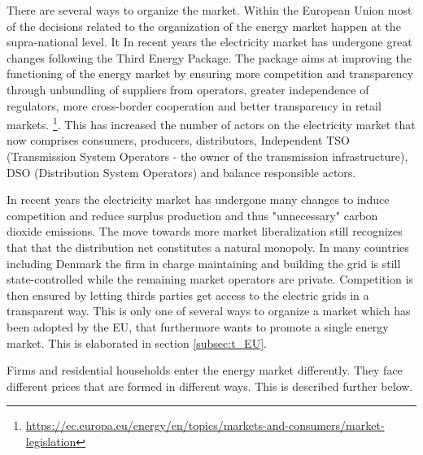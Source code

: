 There are several ways to organize the market. Within the European Union most of the decisions related to the organization of the energy market happen at the supra-national level. It In recent years the electricity market has undergone great changes following the Third Energy Package. The package aims at improving the functioning of the energy market by ensuring more competition and transparency through unbundling of suppliers from operators, greater independence of regulators, more cross-border cooperation and better transparency in retail markets. \footnote{\url{https://ec.europa.eu/energy/en/topics/markets-and-consumers/market-legislation}}. This has increased the number of actors on the electricity market that now comprises consumers, producers, distributors, Independent TSO (Transmission System Operators - the owner of the transmission infrastructure), DSO (Distribution System Operators) and balance responsible actors.
\par
In recent years the electricity market has undergone many changes to induce competition and reduce surplus production and thus "unnecessary" carbon dioxide emissions. The move towards more market liberalization still recognizes that that the distribution net constitutes a natural monopoly. In many countries including Denmark the firm in charge maintaining and building the grid is still state-controlled while the remaining market operators are private. Competition is then ensured by letting thirds parties get access to the electric grids in a transparent way. This is only one of several ways to organize a market which has been adopted by the EU, that furthermore wants to promote a single energy market. This is elaborated in section \ref{subsec:t_EU}.
\par

Firms and residential households enter the energy market differently. They face different prices that are formed in different ways. This is described further below.

